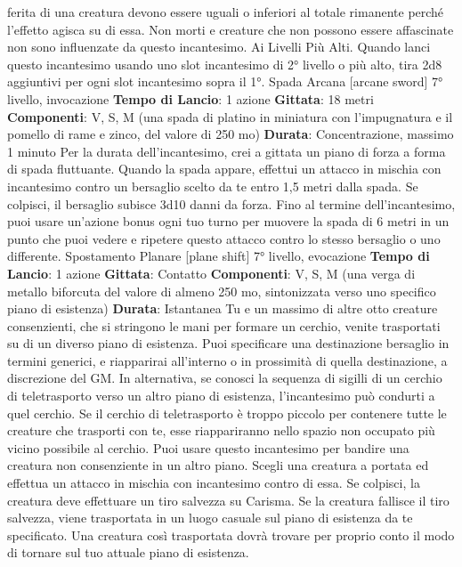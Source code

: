 \begin{multicols}{2}
ferita di una creatura devono essere uguali o inferiori al
totale rimanente perché l’effetto agisca su di essa.
Non morti e creature che non possono essere
affascinate non sono influenzate da questo
incantesimo.
Ai Livelli Più Alti. Quando lanci questo incantesimo
usando uno slot incantesimo di 2° livello o più alto, tira
2d8 aggiuntivi per ogni slot incantesimo sopra il 1°.
Spada Arcana
[arcane sword]
7° livello, invocazione
\textbf{Tempo di Lancio}: 1 azione
\textbf{Gittata}: 18 metri
\textbf{Componenti}: V, S, M (una spada di platino in miniatura
con l’impugnatura e il pomello di rame e zinco, del
valore di 250 mo)
\textbf{Durata}: Concentrazione, massimo 1 minuto
Per la durata dell’incantesimo, crei a gittata un piano di
forza a forma di spada fluttuante.
Quando la spada appare, effettui un attacco in mischia
con incantesimo contro un bersaglio scelto da te entro
1,5 metri dalla spada. Se colpisci, il bersaglio subisce
3d10 danni da forza. Fino al termine dell’incantesimo,
puoi usare un’azione bonus ogni tuo turno per muovere
la spada di 6 metri in un punto che puoi vedere e
ripetere questo attacco contro lo stesso bersaglio o uno
differente.
Spostamento Planare
[plane shift]
7° livello, evocazione
\textbf{Tempo di Lancio}: 1 azione
\textbf{Gittata}: Contatto
\textbf{Componenti}: V, S, M (una verga di metallo biforcuta
del valore di almeno 250 mo, sintonizzata verso uno
specifico piano di esistenza)
\textbf{Durata}: Istantanea
Tu e un massimo di altre otto creature consenzienti,
che si stringono le mani per formare un cerchio, venite
trasportati su di un diverso piano di esistenza. Puoi
specificare una destinazione bersaglio in termini
generici, e riapparirai all’interno o in prossimità di quella
destinazione, a discrezione del GM.
In alternativa, se conosci la sequenza di sigilli di un
cerchio di teletrasporto verso un altro piano di
esistenza, l’incantesimo può condurti a quel cerchio. Se
il cerchio di teletrasporto è troppo piccolo per contenere
tutte le creature che trasporti con te, esse riappariranno
nello spazio non occupato più vicino possibile al
cerchio.
Puoi usare questo incantesimo per bandire una
creatura non consenziente in un altro piano. Scegli una
creatura a portata ed effettua un attacco in mischia con
incantesimo contro di essa. Se colpisci, la creatura
deve effettuare un tiro salvezza su Carisma. Se la
creatura fallisce il tiro salvezza, viene trasportata in un
luogo casuale sul piano di esistenza da te specificato.
Una creatura così trasportata dovrà trovare per proprio
conto il modo di tornare sul tuo attuale piano di
esistenza.

\end{multicols}
